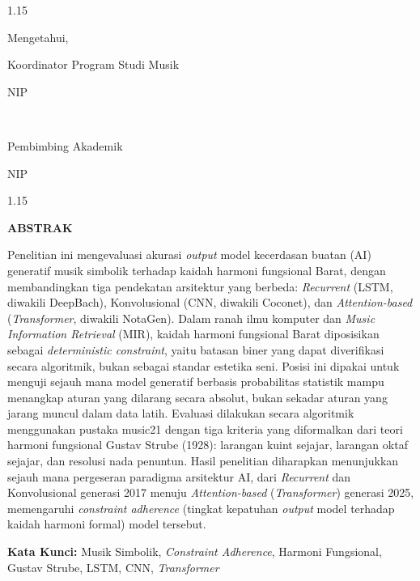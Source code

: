 \begin{spacing}{1.15}
\begin{center}
    \begin{minipage}[t]{0.48\textwidth}
        \raggedright
        Mengetahui,\par
        Koordinator Program Studi Musik\par
        \vspace{2.0cm}
        \underline{\textbf{\advisorthesis}}\par
        NIP \advisorthesisnip
    \end{minipage}
    \hfill
    \begin{minipage}[t]{0.48\textwidth}
        \raggedleft
        ~\par
        Pembimbing Akademik\par
        \vspace{2.0cm}
        \underline{\textbf{\advisoracademic}}\par
        NIP \advisoracademicnip
    \end{minipage}
\end{center}
\end{spacing}

\newpage
\begin{spacing}{1.15}
\begin{center}
    \textbf{ABSTRAK}
\end{center}

Penelitian ini mengevaluasi akurasi \textit{output} model kecerdasan buatan (AI) generatif musik simbolik terhadap kaidah harmoni fungsional Barat, dengan membandingkan tiga pendekatan arsitektur yang berbeda: \textit{Recurrent} (LSTM, diwakili DeepBach), Konvolusional (CNN, diwakili Coconet), dan \textit{Attention-based} (\textit{Transformer}, diwakili NotaGen). Dalam ranah ilmu komputer dan \textit{Music Information Retrieval} (MIR), kaidah harmoni fungsional Barat diposisikan sebagai \textit{deterministic constraint}, yaitu batasan biner yang dapat diverifikasi secara algoritmik, bukan sebagai standar estetika seni. Posisi ini dipakai untuk menguji sejauh mana model generatif berbasis probabilitas statistik mampu menangkap aturan yang dilarang secara absolut, bukan sekadar aturan yang jarang muncul dalam data latih. Evaluasi dilakukan secara algoritmik menggunakan pustaka music21 dengan tiga kriteria yang diformalkan dari teori harmoni fungsional Gustav Strube (1928): larangan kuint sejajar, larangan oktaf sejajar, dan resolusi nada penuntun. Hasil penelitian diharapkan menunjukkan sejauh mana pergeseran paradigma arsitektur AI, dari \textit{Recurrent} dan Konvolusional generasi 2017 menuju \textit{Attention-based} (\textit{Transformer}) generasi 2025, memengaruhi \textit{constraint adherence} (tingkat kepatuhan \textit{output} model terhadap kaidah harmoni formal) model tersebut.\par

\textbf{Kata Kunci:} Musik Simbolik, \textit{Constraint Adherence}, Harmoni Fungsional, Gustav Strube, LSTM, CNN, \textit{Transformer}
\end{spacing}


